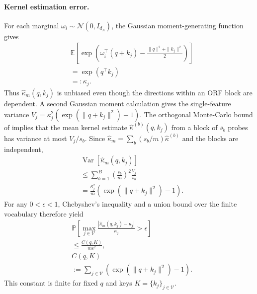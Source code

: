 \documentclass[11pt]{article}
\begin{document}
\paragraph{Kernel estimation error.}
For each marginal $\omega_i\sim\mathcal{N}(0,I_{d_A})$, the Gaussian moment-generating function gives
\begin{equation}
\begin{aligned}
    &\mathbb{E}\!\left[
      \exp\!\left(\omega_i^\top(q+k_j)
             -\frac{\|q\|^2+\|k_j\|^2}{2}\right)
      \right] \\
    &=\exp(q^\top k_j) \\
    &=:\kappa_j.
\end{aligned}
\label{eq:prototype_kernel_expectation}
\end{equation}
Thus $\widehat{\kappa}_m(q,k_j)$ is unbiased even though the directions within an ORF block are dependent. A second Gaussian moment calculation gives the single-feature variance $V_j=\kappa_j^2(\exp(\|q+k_j\|^2)-1)$. The orthogonal Monte-Carlo bound of \citet{performer} implies that the mean kernel estimate $\widehat{\kappa}^{(b)}(q,k_j)$ from a block of $s_b$ probes has variance at most $V_j/s_b$. Since $\widehat{\kappa}_m=\sum_b(s_b/m)\widehat{\kappa}^{(b)}$ and the blocks are independent,
\begin{equation}
\begin{aligned}
    &\operatorname{Var}[\widehat{\kappa}_m(q,k_j)] \\
    &\leq\sum_{b=1}^{B}\left(\frac{s_b}{m}\right)^2\frac{V_j}{s_b} \\
    &=\frac{\kappa_j^2}{m}
          \left(\exp(\|q+k_j\|^2)-1\right).
\end{aligned}
\label{eq:prototype_kernel_variance}
\end{equation}
For any $0<\epsilon<1$, Chebyshev's inequality and a union bound over the finite vocabulary therefore yield
\begin{equation}
\begin{aligned}
    &\mathbb{P}\!\left[
       \max_{j\in\mathcal{V}}
       \frac{|\widehat{\kappa}_m(q,k_j)-\kappa_j|}{\kappa_j}
       >\epsilon\right] \\
    &\leq\frac{C(q,K)}{m\epsilon^2}, \\
    &C(q,K) \\
    &:=\sum_{j\in\mathcal{V}}
                 \left(\exp(\|q+k_j\|^2)-1\right).
\end{aligned}
\label{eq:prototype_relative_error}
\end{equation}
This constant is finite for fixed $q$ and keys $K=\{k_j\}_{j\in\mathcal{V}}$.
\end{document}

